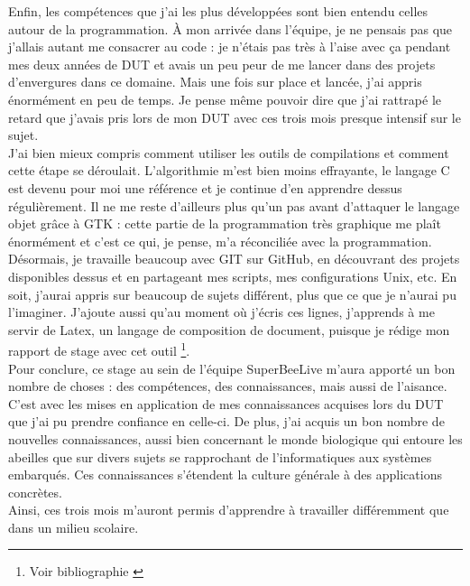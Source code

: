 \documentclass[11pt,french,a4paper]{report}
\begin{document}
Enfin, les compétences que j'ai les plus développées sont bien entendu celles autour de la programmation. 
À mon arrivée dans l'équipe, je ne pensais pas que j'allais autant me consacrer au code : je n'étais pas très à l'aise avec ça 
pendant mes deux années de DUT et avais un peu peur de me lancer dans des projets d'envergures dans ce domaine. 
Mais une fois sur place et lancée, j'ai appris énormément en peu de temps. Je pense même pouvoir dire que j'ai rattrapé le retard 
que j'avais pris lors de mon DUT avec ces trois mois presque intensif sur le sujet. \\
J'ai bien mieux compris comment utiliser les outils de compilations et comment cette étape se déroulait. L'algorithmie m'est bien moins
effrayante, le langage C est devenu pour moi une référence et je continue d'en apprendre dessus régulièrement. 
Il ne me reste d'ailleurs plus qu'un pas avant d'attaquer le langage objet grâce à GTK : cette partie de la programmation très graphique
me plaît énormément et c'est ce qui, je pense, m'a réconciliée avec la programmation. \\
Désormais, je travaille beaucoup avec GIT sur GitHub, en découvrant des projets disponibles dessus et en partageant mes scripts,
mes configurations Unix, etc. 
En soit, j'aurai appris sur beaucoup de sujets différent, plus que ce que je n'aurai pu l'imaginer.
J'ajoute aussi qu'au moment où j'écris ces lignes, j'apprends à me servir de Latex, un langage de composition de document, 
puisque je rédige mon rapport de stage avec cet outil \footnote{Voir bibliographie \cite{ref4} \cite{ref9}}.\\

Pour conclure, ce stage au sein de l'équipe SuperBeeLive m'aura apporté un bon nombre de choses : des compétences, des connaissances, mais 
aussi de l'aisance. C'est avec les mises en application de mes connaissances acquises lors du DUT que j'ai pu prendre confiance en celle-ci.
De plus, j'ai acquis un bon nombre de nouvelles connaissances, aussi bien concernant le monde biologique qui entoure les abeilles que sur 
divers sujets se rapprochant de l'informatiques aux systèmes embarqués. Ces connaissances s'étendent la culture générale à des applications 
concrètes.\\
Ainsi, ces trois mois m'auront permis d'apprendre à travailler différemment que dans un milieu scolaire. 
\end{document}
